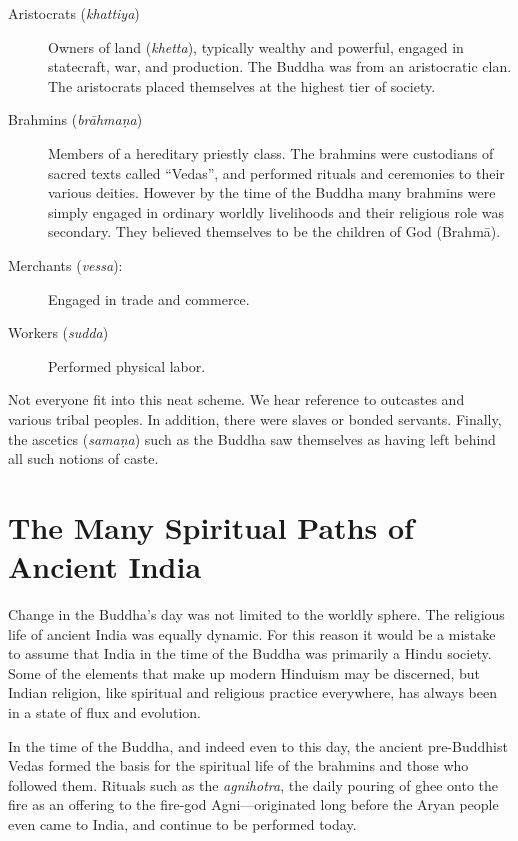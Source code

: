 \documentclass[12pt,openany]{book}%
\begin{document}
\begin{description}%
\item[Aristocrats (\textit{khattiya})] Owners of land (\textit{khetta}), typically wealthy and powerful, engaged in statecraft, war, and production. The Buddha was from an aristocratic clan. The aristocrats placed themselves at the highest tier of society.%
\item[Brahmins (\textit{\textsanskrit{brāhmaṇa}})] Members of a hereditary priestly class. The brahmins were custodians of sacred texts called “Vedas”, and performed rituals and ceremonies to their various deities. However by the time of the Buddha many brahmins were simply engaged in ordinary worldly livelihoods and their religious role was secondary. They believed themselves to be the children of God (\textsanskrit{Brahmā}).%
\item[Merchants (\textit{vessa}):] Engaged in trade and commerce.%
\item[Workers (\textit{sudda})] Performed physical labor.%
\end{description}

Not everyone fit into this neat scheme. We hear reference to outcastes and various tribal peoples. In addition, there were slaves or bonded servants. Finally, the ascetics (\textit{\textsanskrit{samaṇa}}) such as the Buddha saw themselves as having left behind all such notions of caste.

\section*{The Many Spiritual Paths of Ancient India}

Change in the Buddha’s day was not limited to the worldly sphere. The religious life of ancient India was equally dynamic. For this reason it would be a mistake to assume that India in the time of the Buddha was primarily a Hindu society. Some of the elements that make up modern Hinduism may be discerned, but Indian religion, like spiritual and religious practice everywhere, has always been in a state of flux and evolution.

In the time of the Buddha, and indeed even to this day, the ancient pre-Buddhist Vedas formed the basis for the spiritual life of the brahmins and those who followed them. Rituals such as the \textit{agnihotra}, the daily pouring of ghee onto the fire as an offering to the fire-god Agni—originated long before the Aryan people even came to India, and continue to be performed today.
\end{document}
